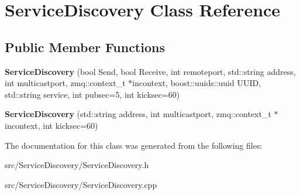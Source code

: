 \hypertarget{classServiceDiscovery}{\section{Service\-Discovery Class Reference}
\label{classServiceDiscovery}
}
\subsection*{Public Member Functions}
\begin{DoxyCompactItemize}
\item 
\hypertarget{classServiceDiscovery_ab69c2cacaf5a388fac88e57f3361b576}{{\bfseries Service\-Discovery} (bool Send, bool Receive, int remoteport, std\-::string address, int multicastport, zmq\-::context\-\_\-t $\ast$incontext, boost\-::uuids\-::uuid U\-U\-I\-D, std\-::string service, int pubsec=5, int kicksec=60)}\label{classServiceDiscovery_ab69c2cacaf5a388fac88e57f3361b576}

\item 
\hypertarget{classServiceDiscovery_a3dbd15f19345b0c9746731308e26b034}{{\bfseries Service\-Discovery} (std\-::string address, int multicastport, zmq\-::context\-\_\-t $\ast$incontext, int kicksec=60)}\label{classServiceDiscovery_a3dbd15f19345b0c9746731308e26b034}

\end{DoxyCompactItemize}


The documentation for this class was generated from the following files\-:\begin{DoxyCompactItemize}
\item 
src/\-Service\-Discovery/Service\-Discovery.\-h\item 
src/\-Service\-Discovery/Service\-Discovery.\-cpp\end{DoxyCompactItemize}
